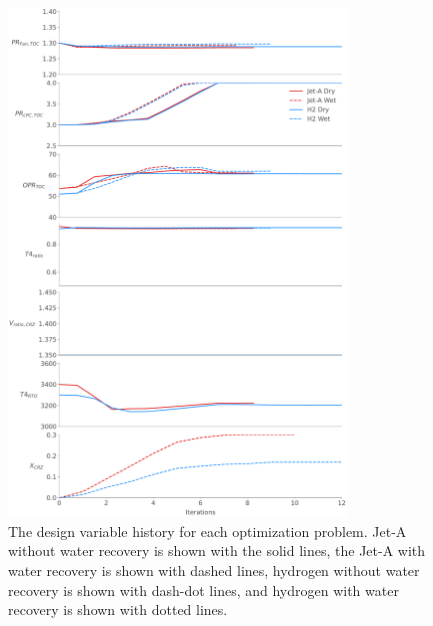 \documentclass[conf]{new-aiaa}
\begin{document}
\begin{figure}[hbt!]
    \centering
    \includegraphics[width=0.8\textwidth]{dvs.pdf}
    \caption{The design variable history for each optimization problem.
        Jet-A without water recovery is shown with the solid lines, the Jet-A with water recovery is shown with dashed lines, hydrogen without water recovery is shown with dash-dot lines, and hydrogen with water recovery is shown with dotted lines.}
    \label{fig:history_dvs}
\end{figure}
\end{document}
